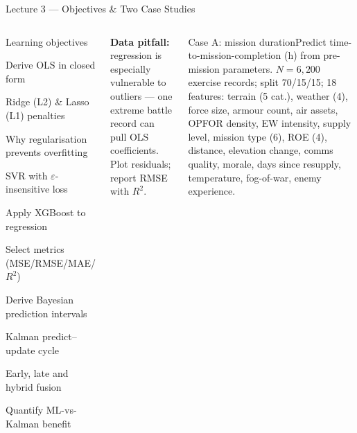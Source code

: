 \documentclass[aspectratio=169,10pt,t]{beamer}
\begin{document}

\begin{frame}{Lecture 3 --- Objectives \& Two Case Studies}
\begin{columns}[T]
\begin{cbox}{Learning objectives}\scriptsize\begin{te}\item Derive OLS in closed form\item Ridge (L2) \& Lasso (L1) penalties\item Why regularisation prevents overfitting\item SVR with $\varepsilon$-insensitive loss\item Apply XGBoost to regression\item Select metrics (MSE/RMSE/MAE/$R^2$)\item Derive Bayesian prediction intervals\item Kalman predict--update cycle\item Early, late and hybrid fusion\item Quantify ML-vs-Kalman benefit\end{te}\end{cbox}
\begin{wbox}\scriptsize\textbf{Data pitfall:} regression is especially vulnerable to outliers --- one extreme battle record can pull OLS coefficients. Plot residuals; report RMSE with $R^2$.\end{wbox}
\begin{cbox}[ISSAnavy]{Case A: mission duration}\scriptsize Predict time-to-mission-completion (h) from pre-mission parameters. $N=6{,}200$ exercise records; split 70/15/15; 18 features: terrain (5 cat.), weather (4), force size, armour count, air assets, OPFOR density, EW intensity, supply level, mission type (6), ROE (4), distance, elevation change, comms quality, morale, days since resupply, temperature, fog-of-war, enemy experience.\end{cbox}

\end{columns}
\end{frame}
\end{document}
